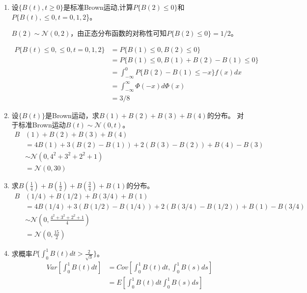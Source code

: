 \begin{enumerate}
	\item 设\(\{B(t),t\geqslant0\}\)是标准Brown运动,计算\(P\{B(2)\leqslant0\}\)和\(P\{B(t),\leqslant0,t=0,1,2\)\}。

	      \(B(2)\sim \mathcal{N}(0,2)\)，由正态分布函数的对称性可知\(P\{B(2)\leqslant0\}=1/2\)。

	      \begin{align*}
		      P\{B(t)\leqslant 0,\leqslant0,t=0,1,2\}
		       & =P\{B(1)\leqslant0,B(2)\leqslant0\}                \\
		       & =P\{B(1)\leqslant0,B(1)+B(2)-B(1)\leqslant0\}      \\
		       & =\int_{-\infty}^{0}P\{B(2)-B(1)\leqslant-x\}f(x)dx \\
		       & =\int_{-\infty}^{\infty}\Phi(-x)d\Phi(x)           \\
		       & =3/8
	      \end{align*}
	\item 设\(\{B(t)\}\)是Brown运动，求\(B(1)+B(2)+B(3)+B(4)\)的分布。
	      对于标准Brown运动\(B(t)\sim \mathcal{N}(0,t)\)。
	      \begin{align*}
		      B & (1)+B(2)+B(3)+B(4)                         \\
		        & =4B(1)+3(B(2)-B(1))+2(B(3)-B(2))+B(4)-B(3) \\
		        & \sim \mathcal{N}(0,4^2+3^2+2^2+1)          \\
		        & =\mathcal{N}(0,30)
	      \end{align*}
	\item 求\(B(\frac{1}{4})+B(\frac{1}{2})+B(\frac{3}{4})+B(1)\)的分布。
	      \begin{align*}
		      B & (1/4)+B(1/2)+B(3/4)+B(1)                               \\
		        & =4B(1/4)+3(B(1/2)-B(1/4))+2(B(3/4)-B(1/2))+B(1)-B(3/4) \\
		        & \sim \mathcal{N}(0,\frac{4^2+3^2+2^2+1}{4})            \\
		        & =\mathcal{N}(0,\frac{15}{2})
	      \end{align*}
	\item 求概率\(P\{\int_{0}^{1} B(t)dt>\frac{2}{\sqrt{3}}\}\)。
	      \begin{align*}
		      Var\left[\int_{0}^{1} B(t)dt\right]
		       & =Cov\left[\int_{0}^{1} B(t)dt,\int_{0}^{1} B(s)ds\right]     \\
		       & =E\left[\int_{0}^{1} B(t)dt\int_{0}^{1} B(s)ds\right]        \\

\end{align*}
\end{enumerate}
